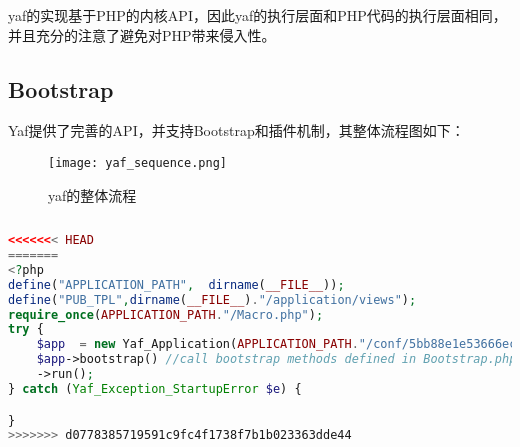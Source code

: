 yaf的实现基于PHP的内核API，因此yaf的执行层面和PHP代码的执行层面相同，并且充分的注意了避免对PHP带来侵入性。



\subsection{Bootstrap}

Yaf提供了完善的API，并支持Bootstrap和插件机制，其整体流程图如下：

\begin{figure}[htbp]
\centering
\texttt{[image: yaf\_sequence.png]}
\caption{yaf的整体流程}
\end{figure}



\begin{lstlisting}[language=PHP]

\end{lstlisting}




\begin{lstlisting}[language=PHP]
<<<<<<< HEAD
=======
<?php
define("APPLICATION_PATH",  dirname(__FILE__));
define("PUB_TPL",dirname(__FILE__)."/application/views");
require_once(APPLICATION_PATH."/Macro.php");
try {
	$app  = new Yaf_Application(APPLICATION_PATH."/conf/5bb88e1e53666ec494f1025023c16dea.ini");
	$app->bootstrap() //call bootstrap methods defined in Bootstrap.php
    ->run();
} catch (Yaf_Exception_StartupError $e) {

}
>>>>>>> d0778385719591c9fc4f1738f7b1b023363dde44

\end{lstlisting}




\begin{lstlisting}[language=PHP]

\end{lstlisting}



\begin{lstlisting}[language=PHP]

\end{lstlisting}




\begin{lstlisting}[language=PHP]

\end{lstlisting}




\begin{lstlisting}[language=PHP]

\end{lstlisting}




\begin{lstlisting}[language=PHP]

\end{lstlisting}




\begin{lstlisting}[language=PHP]

\end{lstlisting}







